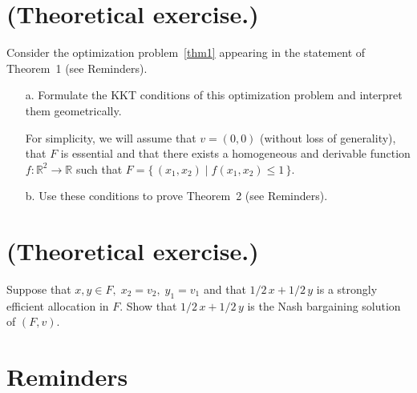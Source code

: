 \documentclass{../ape}
\begin{document}
\section{(Theoretical exercise.)}
Consider the optimization problem~\eqref{thm1} appearing in the statement of Theorem~1 (see Reminders).
\begin{enumerate}
	\item[a.] Formulate the KKT conditions of this optimization problem and interpret them geometrically.

	For simplicity, we will assume that $v = (0, 0)$ (without loss of generality), that $F$ is essential and that there exists a homogeneous and derivable function $f : \mathbb{R}^2 \rightarrow \mathbb{R}$ such that $F = \{ \, (x_1, x_2) \; | \; f(x_1, x_2) \leq 1 \, \}$.
	\item[b.] Use these conditions to prove Theorem~2 (see Reminders).
\end{enumerate}

\section{(Theoretical exercise.)}
Suppose that $x, y \in F, \; x_2 = v_2, \; y_1 = v_1$ and that $1/2 \, x + 1/2 \, y$ is a strongly efficient allocation in $F$. Show that $1/2 \, x + 1/2 \, y$ is the Nash bargaining solution of $(F,v)$.

\newpage

\section*{Reminders}
\end{document}
